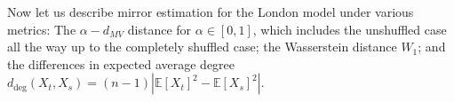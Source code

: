 \documentclass[12pt]{article}
\newcommand{\EE}{\mathbb{E}}
\theoremstyle{definition}
\begin{document}

Now let us describe mirror estimation for the London model under various metrics: The $\alpha-d_{MV}$ distance for $\alpha\in[0,1]$, which includes the unshuffled case all the way up to the completely shuffled case; the Wasserstein distance $W_1$; and the differences in expected average degree $d_{\mathrm{deg}}(X_t,X_s)=(n-1)|\EE[X_t]^2-\EE[X_s]^2|.$
\end{document}
